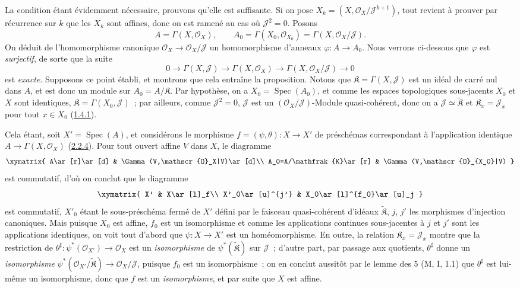 La condition étant évidemment nécessaire, prouvons qu'elle est suffisante.
Si on pose $X_k=(X,\mathscr{O}_X/\mathscr{J}^{k+1})$, tout revient à prouver
par récurrence sur $k$ que les $X_k$ sont affines, donc on est ramené au cas
où $\mathscr{J}^2=0$. Posons
\[
  A=\Gamma(X,\mathscr{O}_X),\qquad
  A_0=\Gamma(X_0,\mathscr{O}_{X_0})
      =\Gamma(X,\mathscr{O}_X/\mathscr{J}).
\]
On déduit de l'homomorphisme canonique
$\mathscr{O}_X\to\mathscr{O}_X/\mathscr{J}$ un homomorphisme d'anneaux
$\varphi:A\to A_0$. Nous verrons ci-dessous que $\varphi$ est
\emph{surjectif}, de sorte que la suite
\[
  0\to\Gamma(X,\mathscr{J})\to\Gamma(X,\mathscr{O}_X)
  \to\Gamma(X,\mathscr{O}_X/\mathscr{J})\to 0
  \tag{5.1.9.1}\label{I.5.1.9.1-fr}
\]
est \emph{exacte}. Supposons ce point établi, et montrons que cela entraîne la
proposition. Notons que $\mathfrak{K}=\Gamma(X,\mathscr{J})$ est un idéal de
carré nul dans $A$, et est donc un module sur $A_0=A/\mathfrak{K}$. Par
hypothèse, on a $X_0=\operatorname{Spec}(A_0)$, et comme les espaces
topologiques sous-jacents $X_0$ et $X$ sont identiques,
$\mathfrak{K}=\Gamma(X_0,\mathscr{J})$~; par ailleurs, comme
$\mathscr{J}^2=0$, $\mathscr{J}$ est un
$(\mathscr{O}_X/\mathscr{J})$-Module quasi-cohérent, donc on a
$\mathscr{J}\simeq\widetilde{\mathfrak{K}}$ et
$\mathfrak{K}_x=\mathscr{J}_x$ pour tout $x\in X_0$
(\hyperref[I.1.4.1-fr]{1.4.1}).

Cela étant, soit $X'=\operatorname{Spec}(A)$, et considérons le morphisme
$f=(\psi,\theta):X\to X'$ de préschémas correspondant à l'application
identique $A\to\Gamma(X,\mathscr{O}_X)$
(\hyperref[I.2.2.4-fr]{2.2.4}). Pour tout ouvert affine $V$ dans $X$, le
diagramme
\[
  \xymatrix{
    A\ar[r]\ar[d] & \Gamma(V,\mathscr{O}_X|V)\ar[d]\\
    A_0=A/\mathfrak{K}\ar[r] & \Gamma(V,\mathscr{O}_{X_0}|V)
  }
\]
est commutatif, d'où on conclut que le diagramme
\[
  \xymatrix{
    X' & X\ar[l]_f\\
    X'_0\ar[u]^{j'} & X_0\ar[l]^{f_0}\ar[u]_j
  }
\]
est commutatif, $X'_0$ étant le sous-préschéma fermé de $X'$ défini par le
faisceau quasi-cohérent d'idéaux $\widetilde{\mathfrak{K}}$, $j$, $j'$ les
morphismes d'injection canoniques. Mais puisque $X_0$ est affine, $f_0$ est un
isomorphisme et comme les applications continues sous-jacentes à $j$ et $j'$
sont les applications identiques, on voit tout d'abord que
$\psi:X\to X'$ est un homéomorphisme. En outre, la relation
$\mathfrak{K}_x=\mathscr{J}_x$ montre que la restriction de
$\theta^\sharp:\psi^*(\mathscr{O}_{X'})\to\mathscr{O}_X$ est un
\emph{isomorphisme} de $\psi^*(\widetilde{\mathfrak{K}})$ sur $\mathscr{J}$~;
d'autre part, par passage aux quotients, $\theta^\sharp$ donne un
\emph{isomorphisme}
$\psi^*(\mathscr{O}_{X'}/\widetilde{\mathfrak{K}})
\to\mathscr{O}_X/\mathscr{J}$, puisque $f_0$ est un isomorphisme~; on en
conclut aussitôt par le lemme des 5 (M, I, 1.1) que $\theta^\sharp$ est
lui-même un isomorphisme, donc que $f$ est un \emph{isomorphisme}, et par suite
que $X$ est affine.


